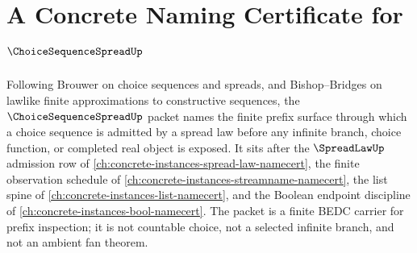 \chapter{A Concrete Naming Certificate for $\ChoiceSequenceSpreadUp$}
\label{ch:concrete-instances-choice-sequence-spread-namecert}

Following Brouwer on choice sequences and spreads, and Bishop--Bridges on
lawlike finite approximations to constructive sequences, the
$\ChoiceSequenceSpreadUp$ packet names the finite prefix surface through which a
choice sequence is admitted by a spread law before any infinite branch, choice
function, or completed real object is exposed. It sits after the
$\SpreadLawUp$ admission row of
\autoref{ch:concrete-instances-spread-law-namecert}, the finite observation
schedule of \autoref{ch:concrete-instances-streamname-namecert}, the list spine
of \autoref{ch:concrete-instances-list-namecert}, and the Boolean endpoint
discipline of \autoref{ch:concrete-instances-bool-namecert}. The packet is a
finite BEDC carrier for prefix inspection; it is not countable choice, not a
selected infinite branch, and not an ambient fan theorem.

